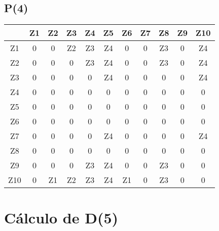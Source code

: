 \documentclass[a4paper,11pt]{article}
\begin{document}
\subsection*{P(4)}
\begin{center}
\begin{tabular}{c|cccccccccc}
 & Z1 & Z2 & Z3 & Z4 & Z5 & Z6 & Z7 & Z8 & Z9 & Z10 \\ \hline
Z1 & 0 & 0 & Z2 & Z3 & Z4 & 0 & 0 & Z3 & 0 & Z4 \\
Z2 & 0 & 0 & 0 & Z3 & Z4 & 0 & 0 & Z3 & 0 & Z4 \\
Z3 & 0 & 0 & 0 & 0 & Z4 & 0 & 0 & 0 & 0 & Z4 \\
Z4 & 0 & 0 & 0 & 0 & 0 & 0 & 0 & 0 & 0 & 0 \\
Z5 & 0 & 0 & 0 & 0 & 0 & 0 & 0 & 0 & 0 & 0 \\
Z6 & 0 & 0 & 0 & 0 & 0 & 0 & 0 & 0 & 0 & 0 \\
Z7 & 0 & 0 & 0 & 0 & Z4 & 0 & 0 & 0 & 0 & Z4 \\
Z8 & 0 & 0 & 0 & 0 & 0 & 0 & 0 & 0 & 0 & 0 \\
Z9 & 0 & 0 & 0 & Z3 & Z4 & 0 & 0 & Z3 & 0 & 0 \\
Z10 & 0 & Z1 & Z2 & Z3 & Z4 & Z1 & 0 & Z3 & 0 & 0 \\
\end{tabular}
\end{center}
\newpage
\section*{Cálculo de D(5)}
\end{document}
